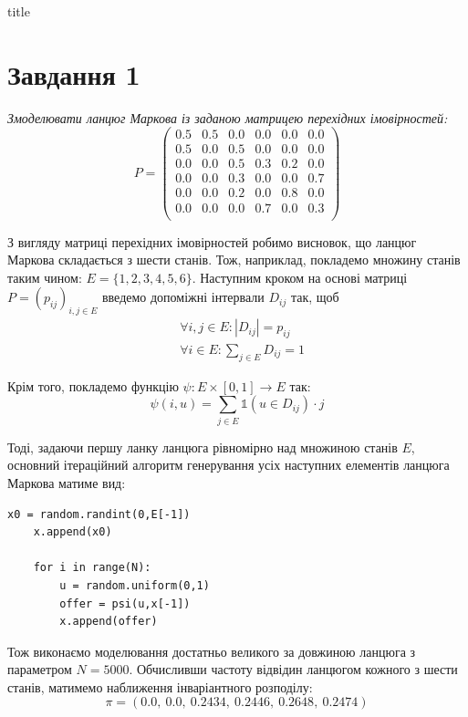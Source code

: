 \documentclass[a4paper,14pt]{extarticle} %
\numberwithin{equation}{section}
\begin{document}
{title}

\section*{Завдання 1}

\textit{Змоделювати ланцюг Маркова із заданою матрицею перехідних імовірностей:}
\begin{equation*}
    P = 
    \begin{pmatrix}
        0.5 & 0.5 & 0.0 & 0.0 & 0.0 & 0.0 \\
        0.5 & 0.0 & 0.5 & 0.0 & 0.0 & 0.0 \\
        0.0 & 0.0 & 0.5 & 0.3 & 0.2 & 0.0 \\
        0.0 & 0.0 & 0.3 & 0.0 & 0.0 & 0.7 \\
        0.0 & 0.0 & 0.2 & 0.0 & 0.8 & 0.0 \\
        0.0 & 0.0 & 0.0 & 0.7 & 0.0 & 0.3 \\
    \end{pmatrix}
\end{equation*}

З вигляду матриці перехідних імовірностей робимо висновок, що ланцюг Маркова складається з шести станів. Тож, наприклад, покладемо множину станів таким чином: $E=\{1,2,3,4,5,6\}$. Наступним кроком на основі матриці $P=(p_{ij})_{i,j\in E}$ введемо допоміжні інтервали $D_{ij}$ так, щоб 
\begin{align*} 
    &\forall i,j\in E: |D_{ij}| = p_{ij} \\ 
    &\forall i\in E: \sum\limits_{j\in E}D_{ij}=1
\end{align*} 

Крім того, покладемо функцію $\psi: E\times[0,1] \rightarrow E$ так:
\[ \psi(i,u)=\sum\limits_{j\in E}\mathds{1}(u\in D_{ij})\cdot j \]

Тоді, задаючи першу ланку ланцюга рівномірно над множиною станів $E$, основний ітераційний алгоритм генерування усіх наступних елементів ланцюга Маркова матиме вид:

\begin{lstlisting}[firstnumber=1, label = code: task 1, caption = Генерування ланцюга Маркова]
    x0 = random.randint(0,E[-1])
    x.append(x0)
    
    for i in range(N):
        u = random.uniform(0,1)
        offer = psi(u,x[-1])
        x.append(offer)
\end{lstlisting}

\vspace{0.4cm}
Тож виконаємо моделювання достатньо великого за довжиною ланцюга з параметром $N=5000$. Обчисливши частоту відвідин ланцюгом кожного з шести станів, матимемо наближення інваріантного розподілу:
\[ \pi=(0.0,\ 0.0,\ 0.2434,\ 0.2446,\ 0.2648,\ 0.2474) \] 
\end{document}
